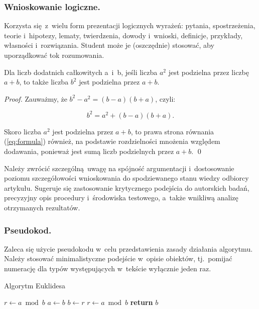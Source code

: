 \subsubsection{Wnioskowanie logiczne.}
\label{subsubsec:logic}

Korzysta się z~wielu form prezentacji logicznych wyrażeń: pytania, spostrzeżenia, teorie i~hipotezy, lematy, twierdzenia, dowody i~wnioski, definicje, przykłady, własności i~rozwiązania. Student może je (oszczędnie) stosować, aby uporządkować tok rozumowania.

\begin{claim}
	Dla liczb dodatnich całkowitych a~i~b, jeśli liczba $a^{2}$ jest podzielna przez liczbę $a+b$, to także liczba $b^{2}$ jest podzielna przez $a+b$.
\end{claim}
\begin{proof}
	Zauważmy, że $b^{2} - a^{2} = (b-a)(b+a)$, czyli:

	\begin{equation} \label{eq:formula}
		b^{2} = a^{2} + (b-a)(b+a).
	\end{equation}

	\noindent Skoro liczba $a^{2}$ jest podzielna przez $a+b$, to prawa strona równania (\ref{eq:formula}) również, na podstawie rozdzielności mnożenia względem dodawania, ponieważ jest sumą liczb podzielnych przez $a+b$. \qed
\end{proof}

Należy zwrócić szczególną uwagę na spójność argumentacji i~dostosowanie poziomu szczegółowości wnioskowania do spodziewanego stanu wiedzy odbiorcy artykułu. Sugeruje się zastosowanie krytycznego podejścia do autorskich badań, precyzyjny opis procedury i~środowiska testowego, a~także wnikliwą analizę otrzymanych rezultatów.

\subsubsection{Pseudokod.}
\label{subsubsec:pseudocode}

Zaleca się użycie pseudokodu w~celu przedstawienia zasady działania algorytmu. Należy stosować minimalistyczne podejście w~opisie obiektów, tj.~pomijać numerację dla typów występujących w~tekście wyłącznie jeden raz.

\vspace{-4mm}
\begin{algorithm}
	\renewcommand{\thealgorithm}{} %
	\caption{Algorytm Euklidesa} \label{alg:euclid}
	\begin{algorithmic}[1]
		 
			\State $r\gets a\bmod b$
			 
				\State $a\gets b$
				\State $b\gets r$
				\State $r\gets a\bmod b$
			\EndWhile \label{alg:euclid:endwhile}
			\State \textbf{return} $b$
		\EndProcedure
	\end{algorithmic}
\end{algorithm}
\vspace{-8mm}

